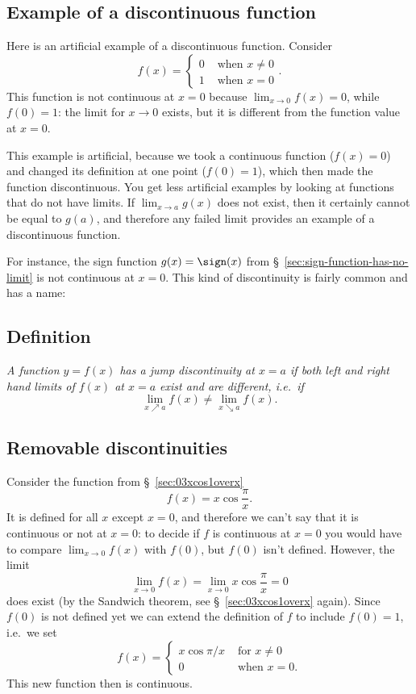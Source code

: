 \subsection{Example of a discontinuous function}
Here is an artificial example of a discontinuous function.  Consider  
\[
f(x) = 
\begin{cases}
  0 & \text{ when } x\neq0 \\
  1 & \text{ when } x=0
\end{cases}.
\]%
%
This function is not continuous at $x=0$ because $\lim_{x\to0} f(x) =
0$, while $f(0) = 1$: the limit for $x\to0$ exists, but it is
different from the function value at $x=0$.

This example is artificial, because we took a continuous function
($f(x) = 0$) and changed its definition at one point ($f(0) = 1$),
which then made the function discontinuous.  You get less artificial
examples by looking at functions that do not have limits.  If
$\lim_{x\to a} g(x)$ does not exist, then it certainly cannot be equal
to $g(a)$, and therefore any failed limit provides an example of a
discontinuous function.

For instance, the sign function $g(x) = \sign(x)$ from
\S~\ref{sec:sign-function-has-no-limit} is not continuous at $x=0$.
This kind of discontinuity is fairly common and has a name:

\subsection{Definition}%
\itshape  A function $y=f(x)$ has a \emph{jump discontinuity} at $x=a$
if both left and right hand limits of $f(x)$  at $x=a$ exist and are
different, i.e.~if
\[
\lim_{x\nearrow a} f(x) \neq \lim_{x\searrow a} f(x).
\]
\upshape

\subsection{Removable discontinuities}
\label{sec:removable-discontinuities}
Consider the function from \S~\ref{sec:03xcos1overx}
\[
f(x) = x\cos\frac{\pi} {x}.
\]
It is defined for all $x$ except $x=0$, and therefore we can't say
that it is continuous or not at $x=0$: to decide if $f$ is continuous
at $x=0$ you would have to compare $\lim_{x\to0} f(x)$ with $f(0)$,
but $f(0)$ isn't defined.  However, the limit
\[
\lim_{x\to 0} f(x) =\lim_{x\to 0} x \cos\frac{\pi} {x} = 0
\]
does exist (by the Sandwich theorem, see \S~\ref{sec:03xcos1overx}
again).
\marginpar{}
Since $f(0)$ is not defined yet we can extend the
definition of $f$ to include $f(0) = 1$, i.e.~we set
\[
f(x) =
\begin{cases}
  x\cos \pi/x & \text{ for }x\neq0\\
  0 & \text{ when }x=0 .
\end{cases}
\]
This new function then is continuous.

